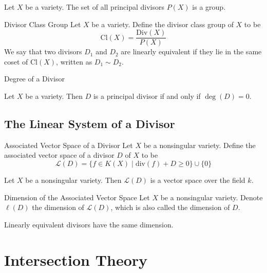 \documentclass[a4paper]{article}
\begin{document}
\begin{prp}{}{} Let $X$ be a variety. The set of all principal divisors $P(X)$ is a group. 
\end{prp}

\begin{defn}{Divisor Class Group}{} Let $X$ be a variety. Define the divisor class group of $X$ to be $$\text{Cl}(X)=\frac{\text{Div}(X)}{P(X)}$$
We say that two divisors $D_1$ and $D_2$ are linearly equivalent if they lie in the same coset of $\text{Cl}(X)$, written as $D_1\sim D_2$. 
\end{defn}

\begin{defn}{Degree of a Divisor}{}
\end{defn}

\begin{prp}{}{} Let $X$ be a variety. Then $D$ is a principal divisor if and only if $\deg(D)=0$. 
\end{prp}

\subsection{The Linear System of a Divisor}
\begin{defn}{Associated Vector Space of a Divisor}{} Let $X$ be a nonsingular variety. Define the associated vector space of a divisor $D$ of $X$ to be $$\mathcal{L}(D)=\{f\in K(X)\;|\;\text{div}(f)+D\geq 0\}\cup\{0\}$$
\end{defn}

\begin{lmm}{}{} Let $X$ be a nonsingular variety. Then $\mathcal{L}(D)$ is a vector space over the field $k$. 
\end{lmm}

\begin{defn}{Dimension of the Associated Vector Space}{} Let $X$ be a nonsingular variety. Denote $\ell(D)$ the dimension of $\mathcal{L}(D)$, which is also called the dimension of $D$. 
\end{defn}

\begin{thm}{}{} Linearly equivalent divisors have the same dimension. 
\end{thm}

\pagebreak
\section{Intersection Theory}
\end{document}
